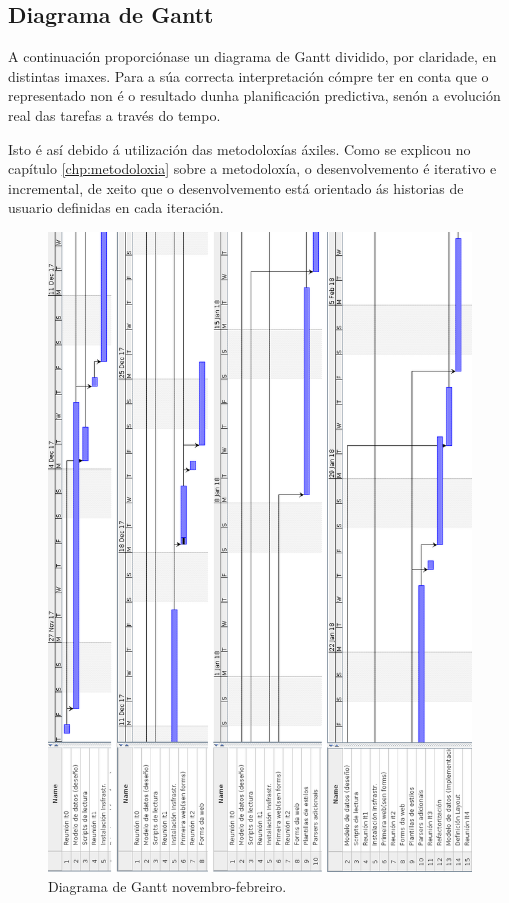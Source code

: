 \subsection{Diagrama de Gantt}

A continuación proporciónase un diagrama de Gantt dividido, por claridade, en distintas imaxes. Para a súa correcta interpretación cómpre ter en conta que o representado non é o resultado dunha planificación predictiva, senón a evolución real das tarefas a través do tempo. 

Isto é así debido á utilización das metodoloxías áxiles. Como se explicou no capítulo \ref{chp:metodoloxia} sobre a metodoloxía, o desenvolvemento é iterativo e incremental, de xeito que o desenvolvemento está orientado ás historias de usuario definidas en cada iteración.



\begin{figure}[H]
	\centering
	\includegraphics[scale=0.45,keepaspectratio=true]{./images/gantt/gc1.png}
	\caption{Diagrama de Gantt novembro-febreiro.}
\end{figure}

